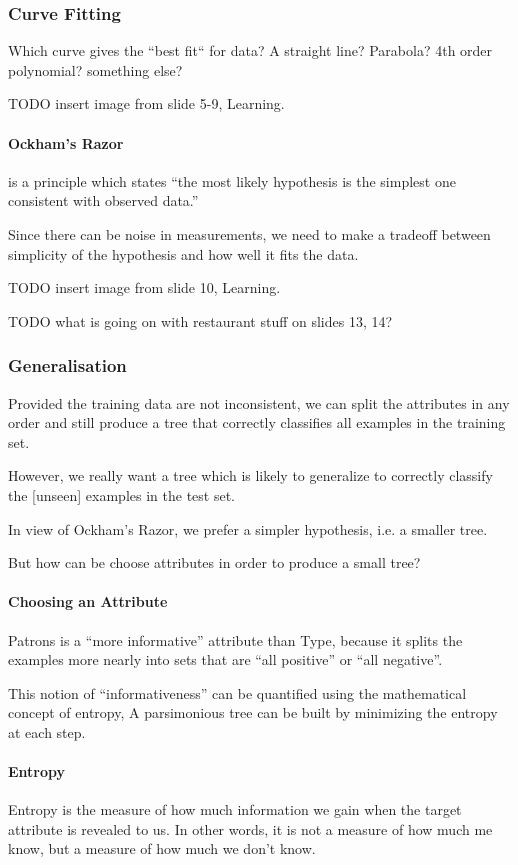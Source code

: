\subsubsection{Curve Fitting}
Which curve gives the ``best fit`` for data? A straight line? Parabola? 4th
order polynomial? something else?

TODO insert image from slide 5-9, Learning.

\paragraph{Ockham's Razor} is a principle which states ``the most likely
hypothesis is the simplest one consistent with observed data.''

Since there can be noise in measurements, we need to make a tradeoff between
simplicity of the hypothesis and how well it fits the data.

TODO insert image from slide 10, Learning.

TODO what is going on with restaurant stuff on slides 13, 14?

\subsubsection{Generalisation}
Provided the training data are not inconsistent, we can split the attributes in
any order and still produce a tree that correctly classifies all examples in
the training set.

However, we really want a tree which is likely to generalize to correctly
classify the [unseen] examples in the test set.

In view of Ockham's Razor, we prefer a simpler hypothesis, i.e. a smaller tree.

But how can be choose attributes in order to produce a small tree?

\paragraph{Choosing an Attribute}
Patrons is a ``more informative'' attribute than Type, because it splits the
examples more nearly into sets that are ``all positive'' or ``all negative''.

This notion of ``informativeness'' can be quantified using the mathematical
concept of entropy, A parsimonious tree can be built by minimizing the entropy
at each step.

\paragraph{Entropy}
Entropy is the measure of how much information we gain when the target
attribute is revealed to us. In other words, it is not a measure of how much me
know, but a measure of how much we don't know.

